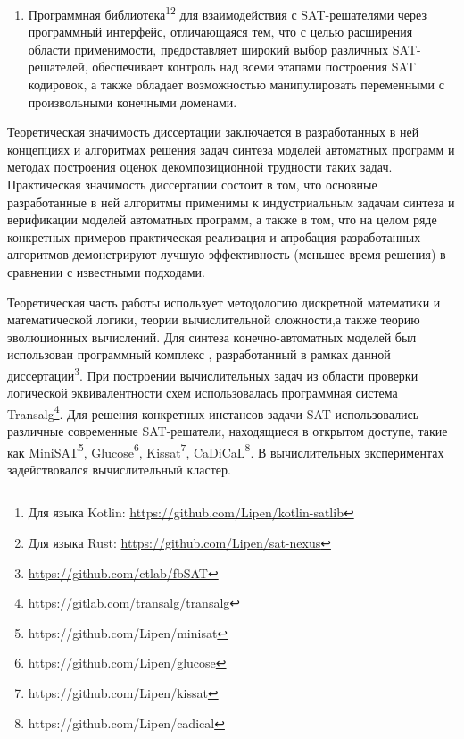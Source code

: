 \begin{enumerate}[beginpenalty=10000]
    \item Программная библиотека\footnote{Для языка Kotlin: \url{https://github.com/Lipen/kotlin-satlib}}\footnote{Для языка Rust: \url{https://github.com/Lipen/sat-nexus}} для взаимодействия с SAT-решателями через программный интерфейс, отличающаяся тем, что с целью расширения области применимости, предоставляет широкий выбор различных SAT-решателей, обеспечивает контроль над всеми этапами построения SAT кодировок, а также обладает возможностью манипулировать переменными с произвольными конечными доменами.
\end{enumerate}


\influence
%
Теоретическая значимость диссертации заключается в разработанных в ней концепциях и алгоритмах решения задач синтеза моделей автоматных программ и методах построения оценок декомпозиционной трудности таких задач.
Практическая значимость диссертации состоит в том, что основные разработанные в ней алгоритмы применимы к индустриальным задачам синтеза и верификации моделей автоматных программ, а также в том, что на целом ряде конкретных примеров практическая реализация и апробация разработанных алгоритмов демонстрируют лучшую эффективность (меньшее время решения) в сравнении с известными подходами.


\methods
%
Теоретическая часть работы использует методологию дискретной математики и математической логики, теории вычислительной сложности,а также теорию эволюционных вычислений.
Для синтеза конечно-автоматных моделей был использован программный комплекс , разработанный в рамках данной диссертации\footnote{\url{https://github.com/ctlab/fbSAT}}.
При построении вычислительных задач из области проверки логической эквивалентности схем использовалась программная система Transalg\footnote{\url{https://gitlab.com/transalg/transalg}}.
Для решения конкретных инстансов задачи SAT использовались различные современные SAT-решатели, находящиеся в открытом доступе, такие как MiniSAT\footnote{https://github.com/Lipen/minisat}, Glucose\footnote{https://github.com/Lipen/glucose}, Kissat\footnote{https://github.com/Lipen/kissat}, CaDiCaL\footnote{https://github.com/Lipen/cadical}.
В вычислительных экспериментах задействовался вычислительный кластер.


